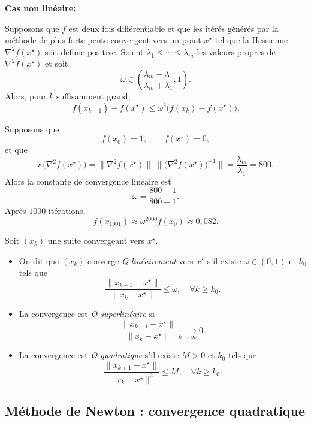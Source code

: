 \textbf{Cas non linéaire:}
\begin{theoreme}
\label{thm:SD-nonlinear-rate}
Supposons que $f$ est deux fois différentiable et que les itérés générés par la
méthode de plus forte pente convergent vers un point $x^\star$ tel que la Hessienne
$\nabla^2 f(x^\star)$ soit définie positive. Soient
$\lambda_1 \le \cdots \le \lambda_m$ les valeurs propres de $\nabla^2 f(x^\star)$
et soit
\[
    \omega \in \left(\frac{\lambda_m - \lambda_1}{\lambda_m + \lambda_1}, 1\right).
\]
Alors, pour $k$ suffisamment grand,
\[
    f(x_{k+1}) - f(x^\star)
    \le \omega^2 \bigl( f(x_k) - f(x^\star) \bigr).
\]
\end{theoreme}

\begin{exemple}
Supposons que
\[
    f(x_0) = 1, \qquad f(x^\star) = 0,
\]
et que
\[
    \kappa\bigl(\nabla^2 f(x^\star)\bigr)
    = \|\nabla^2 f(x^\star)\|\;\bigl\|\bigl(\nabla^2 f(x^\star)\bigr)^{-1}\bigr\|
    = \frac{\lambda_m}{\lambda_1} = 800.
\]
Alors la constante de convergence linéaire est
\[
    \omega = \frac{800 - 1}{800 + 1}.
\]
Après $1000$ itérations,
\[
    f(x_{1001}) \approx \omega^{2000} f(x_0) \approx 0{,}082.
\]
\end{exemple}

\begin{definition}
\label{def:convergence-rates}
Soit $(x_k)$ une suite convergeant vers $x^\star$.
\begin{itemize}
    \item On dit que $(x_k)$ converge \emph{Q-linéairement} vers $x^\star$ s’il existe
    $\omega \in (0,1)$ et $k_0$ tels que
    \[
        \frac{\|x_{k+1} - x^\star\|}{\|x_k - x^\star\|}
        \le \omega, \quad \forall k \ge k_0.
    \]
    \item La convergence est \emph{Q-superlinéaire} si
    \[
        \frac{\|x_{k+1} - x^\star\|}{\|x_k - x^\star\|}
        \xrightarrow[k\to\infty]{} 0.
    \]
    \item La convergence est \emph{Q-quadratique} s’il existe $M>0$ et $k_0$ tels que
    \[
        \frac{\|x_{k+1} - x^\star\|}{\|x_k - x^\star\|^2}
        \le M,\quad \forall k \ge k_0.
    \]
\end{itemize}
\end{definition}

\subsection{Méthode de Newton : convergence quadratique}
\label{subsec:2.4.5}

